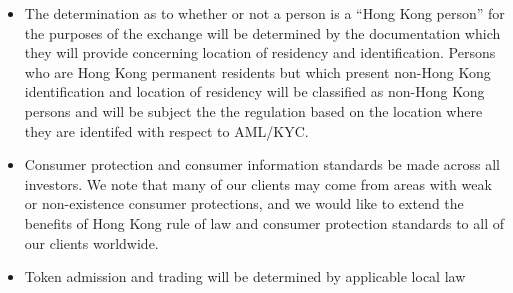 \begin{itemize}
  \item The determination as to whether or not a person is a ``Hong
    Kong person'' for the purposes of the exchange will be determined
    by the documentation which they will provide concerning location
    of residency and identification.  Persons who are Hong Kong
    permanent residents but which present non-Hong Kong identification and
    location of residency will be classified as non-Hong Kong persons
    and will be subject the the regulation based on the location where
    they are identifed with respect to AML/KYC.
  \item Consumer protection and consumer information standards be made
    across all investors.  We note that many of our clients may come
    from areas with weak or non-existence consumer protections, and we
    would like to extend the benefits of Hong Kong rule of law and
    consumer protection standards to all of our clients worldwide.
  \item Token admission and trading will be determined by applicable
    local law
\end{itemize}

